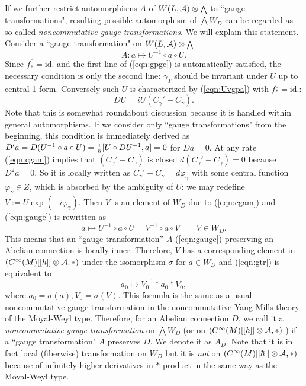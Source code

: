 \documentclass[10pt,a4paper]{article}
\def\h{\hbar}
\begin{document}
If we further restrict automorphisms $A$ of $W(L,{\cal A})\otimes{\scriptstyle \bigwedge}$ to ``gauge transformations", resulting possible automorphism of ${\scriptstyle \bigwedge} W_D$ can be regarded as so-called {\it noncommutative gauge transformations}. We will explain this statement. Consider a ``gauge transformation" on $W(L,{\cal A})\otimes{\scriptstyle \bigwedge}$
\begin{equation}
\label{eqn:gauge}
A: a\mapsto U^{-1}\circ a \circ U.
\end{equation}
Since $f^0_*=$id. and the first line of (\ref{eqn:gpgc}) is automatically satisfied, the necessary condition is only the second line: $\gamma_T$ should be invariant under $U$ up to central 1-form. Conversely such $U$ is characterized by (\ref{eqn:Uvgpa}) with $f^0_*=$id.:
\begin{equation}
\label{eqn:cgam}
DU=iU(C_\gamma'-C_\gamma).
\end{equation}
Note that this is somewhat roundabout discussion because it is handled within general automorphisms. If we consider only ``gauge transformations" from the beginning, this condition is immediately derived as $D'a=D(U^{-1}\circ a\circ U)={i\over\h}[U\circ DU^{-1},a]=0$ for $Da=0$.
At any rate (\ref{eqn:cgam}) implies that $(C_\gamma'-C_\gamma)$ is closed $d(C_\gamma'-C_\gamma)=0$ because $D^2a=0$. So it is locally written as $C_\gamma'-C_\gamma=d\varphi_\gamma$ with some central function $\varphi_\gamma\in Z$, which is absorbed by the ambiguity of $U$: we may redefine $V:=U\exp(-i\varphi_\gamma)$. Then $V$ is an element of $W_D$ due to (\ref{eqn:cgam}) and (\ref{eqn:gauge}) is rewritten as
\begin{equation}
\label{eqn:gtr}
a\mapsto U^{-1}\circ a\circ U=V^{-1}\circ a\circ V  \qquad V\in W_D.
\end{equation}
This means that an ``gauge transformation'' $A$ (\ref{eqn:gauge}) preserving an Abelian connection is locally inner. Therefore, $V$ has a corresponding element in $(C^\infty(M)[[\h]]\otimes {\cal A},*)$ under the isomorphism $\sigma$ for $a\in W_D$ and (\ref{eqn:gtr}) is equivalent to
\begin{equation}
\label{eqn:gstar}
a_0\mapsto V_0^{-1}*a_0*V_0,
\end{equation}
where $a_0=\sigma(a),V_0=\sigma(V)$. This formula is the same as a usual noncommutative gauge transformation in the noncommutative Yang-Mills theory of the Moyal-Weyl type. Therefore, for an Abelian connection $D$, we call it a {\it noncommutative gauge transformation} on ${\scriptstyle \bigwedge}W_D$ (or on $(C^\infty(M)[[\h]]\otimes {\cal A},*)$ ) if a ``gauge transformation" $A$ preserves $D$. We denote it as $A_D$. Note that it is in fact local (fiberwise) transformation on $W_D$ but it is {\it not} on $(C^\infty(M)[[\h]]\otimes {\cal A},*)$ because of infinitely higher derivatives in $*$ product in the same way as the Moyal-Weyl type.\\
\end{document}
